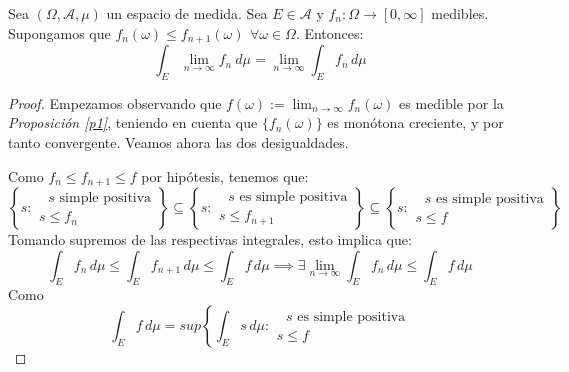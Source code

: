 \begin{nth} \label{tcm}
  Sea $(\Omega,\mathscr A,\mu)$ un espacio de medida. Sea $E\in \mathscr A$ y $f_n: \Omega \to [0,\infty]$ medibles. Supongamos que $f_n(\omega) \leq f_{n+1}(\omega) \, \ \forall \omega \in \Omega$. Entonces:
  \[
    \int_E \lim_{n \to \infty} f_n\ d\mu = \lim_{n \to \infty}\int_E f_n\, d \mu
  \]
\end{nth}

  \begin{proof} Empezamos observando que $\displaystyle f(\omega):= \lim _{n\to \infty} f_n(\omega)$ es medible por la \textit{Proposición \ref{p1}}, teniendo en cuenta que $\{f_n(\omega)\}$ es monótona creciente, y por tanto convergente. Veamos ahora las dos desigualdades.

    \boxed{\geq} Como $f_n \leq f_{n+1} \leq f$ por hipótesis, tenemos que:
    \[
    \left\{ s  : \begin{array}{r} \text{ $s$ simple positiva}\\
        s \leq f_n
      \end{array}\right\}  \subseteq \left\{ s: \begin{array}{r} \text{ $s$ es simple positiva}\\
        s\leq f_{n+1}

      \end{array} \right\} \subseteq \left\{s: \begin{array}{r}\text{ $s$ es simple positiva}\\ s \leq f

      \end{array}\right\}
    \]
    Tomando supremos de las respectivas integrales, esto implica que:
    \[
      \int_E f_n\, d \mu \leq \int_E f_{n+1}\, d\mu \leq \int_E f\, d \mu \implies \exists \lim_{n\to \infty} \int_E f_n\, d\mu \leq \int_E f\, d \mu
    \]
    \boxed{\leq} Como
    \[
      \int_E f\, d \mu = sup \left\{\int_E s\, d\mu : \begin{array}{r} \text{ $s$ es simple positiva}\\
        s \leq f


\end{array}\]
\end{proof}
